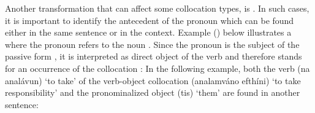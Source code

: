 \documentclass[output=paper]{langsci/langscibook}
\begin{document}
{{{Another\ili{} transformation\ili{} that\ili{} can\ili{} affect\ili{} some\ili{} collocation\ili{} types\ili{},\ili{} is\ili{} \ili{}\isi{}\ili{}.\ili{} \ili{} In\ili{} such\ili{} cases\ili{},\ili{} it\ili{} is\ili{} important\ili{} to\ili{} identify\ili{} the\ili{} antecedent\ili{} of\ili{} the\ili{} pronoun\ili{} which\ili{} can\ili{} be\ili{} found\ili{} either\ili{} in\ili{} the\ili{} same\ili{} sentence\ili{} or\ili{} in\ili{} the\ili{} context\ili{}.\ili{} Example\ili{} \ili{}(\ili{}\ili{})\ili{} below\ili{} illustrates\ili{} a\ili{} \ili{}\isi{}\ili{} where\ili{} the\ili{} pronoun\ili{} \ili{}\textit{}\ili{} refers\ili{} to\ili{} the\ili{} noun\ili{} \ili{}\textit{}\ili{}.\ili{} Since\ili{} the\ili{} pronoun\ili{} is\ili{} the\ili{} subject\ili{} of\ili{} the\ili{} passive\ili{} form\ili{} \ili{}\textit{}\ili{},\ili{} it\ili{} is\ili{} interpreted\ili{} as\ili{} direct\ili{} object\ili{} of\ili{} the\ili{} verb\ili{} and\ili{} therefore\ili{} stands\ili{} for\ili{} an\ili{} occurrence\ili{} of\ili{} the\ili{} collocation\ili{} \ili{}\textit{}\ili{}:\ili{}
\ili{}
\ili{}\makeex{}\ili{}
\ili{}
In\ili{} the\ili{} following\ili{} example\ili{},\ili{} both\ili{} the\ili{} verb\ili{} \ili{} \ili{}(na\ili{} analávun\ili{})\ili{} \ili{}`to\ili{} take\ili{}'\ili{} of\ili{} the\ili{} verb\ili{}-object\ili{} collocation\ili{} \ili{} \ili{}(analamváno\ili{} efthíni\ili{})\ili{} \ili{}`to\ili{} take\ili{} responsibility\ili{}'\ili{} and\ili{} the\ili{} pronominalized\ili{} object\ili{} \ili{} \ili{}(tis\ili{})\ili{} \ili{}`them\ili{}'\ili{} are\ili{} found\ili{} in\ili{} another\ili{} sentence\ili{}:\ili{} \ili{}
\ili{}
\ili{}\makeex{}}}}
\end{document}
